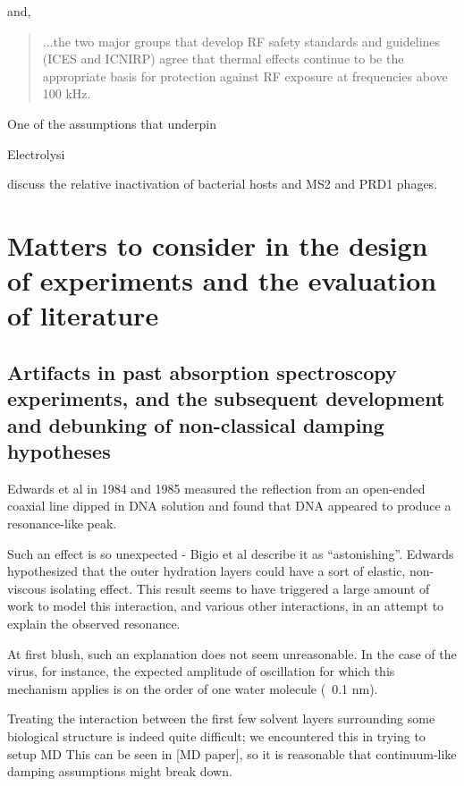 \documentclass[paper.tex]{subfiles}
\begin{document}
\begin{multicols}{1}
and, 

\begin{quote}
	...the two major groups that develop RF safety standards and
	guidelines (ICES and ICNIRP) agree that thermal effects continue to be the appropriate basis for protection
	against RF exposure at frequencies above 100 kHz.
\end{quote}



One of the assumptions that underpin 



Electrolysi

\cite{comparative2003} discuss the relative inactivation of bacterial hosts and MS2 and PRD1 phages. 

\section{Matters to consider in the design of experiments and the evaluation of literature}

\subsection{Artifacts in past absorption spectroscopy experiments, and the subsequent development and debunking of non-classical damping hypotheses}

Edwards et al in 1984 and 1985 measured the reflection from an open-ended coaxial line dipped in DNA solution and found that DNA appeared to produce a resonance-like peak.

Such an effect is so unexpected - Bigio et al describe it as “astonishing”. Edwards hypothesized that the outer hydration layers could have a sort of elastic, non-viscous isolating effect. This result seems to have triggered a large amount of work to model this interaction, and various other interactions, in an attempt to explain the observed resonance.

At first blush, such an explanation does not seem unreasonable. In the case of the virus, for instance, the expected amplitude of oscillation for which this mechanism applies is on the order of one water molecule (~0.1 nm).

Treating the interaction between the first few solvent layers surrounding some biological structure is indeed quite difficult; we encountered this in trying to setup MD This can be seen in [MD paper], so it is reasonable that continuum-like damping assumptions might break down. 


\end{multicols}
\end{document}
